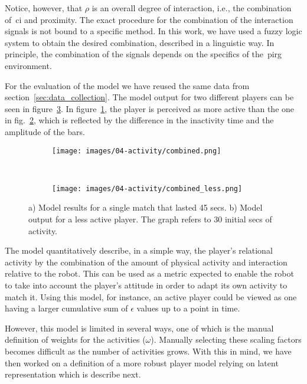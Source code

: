 Notice, however, that $\rho$ is an overall degree of interaction, i.e., the combination of~\gls{ci} and proximity. The exact procedure for the combination of the interaction signals is not bound to a specific method. In this work, we have used a fuzzy logic system to obtain the desired combination, described in a linguistic way. In principle, the combination of the signals depends on the specifics of the~\gls{pirg} environment.

For the evaluation of the model we have reused the same data from section~\ref{sec:data_collection}. The model output for two different players can be seen in figure~\ref{fig:model_output}. In figure~\ref{fig:fun}, the player is perceived as more active than the one in fig.~\ref{fig:nofun}, which is reflected by the difference in the inactivity time and the amplitude of the bars.

\begin{figure}[h]
    \centering 
	\begin{subfigure}[h]{5cm}
		\centering      
		\texttt{[image: images/04-activity/combined.png]}
		\caption{}
		\label{fig:fun}
	\end{subfigure}
	~
	\begin{subfigure}[h]{5cm}
		\centering      
      	\texttt{[image: images/04-activity/combined\_less.png]}
      	\caption{}
      	\label{fig:nofun}
     \end{subfigure}
      \caption{a) Model results for a single match that lasted 45 secs. b) Model output for a less active player. The graph refers to 30 initial secs of activity.}		
      \label{fig:model_output}
\end{figure}

The model quantitatively describe, in a simple way, the player's relational activity by the combination of the amount of physical activity and interaction relative to the robot. This can be used as a metric expected to enable the robot to take into account the player's attitude in order to adapt its own activity to match it. Using this model, for instance, an active player could be viewed as one having a larger cumulative sum of $\epsilon$ values up to a point in time.

However, this model is limited in several ways, %
one of which is the manual definition of weights for the activities ($\omega$). Manually selecting these scaling factors becomes difficult as the number of activities grows. With this in mind, we have then worked on a definition of a more robust player model relying on latent representation which  is describe next.

